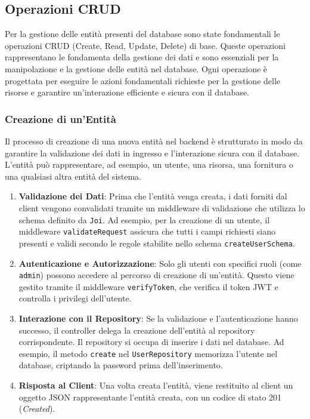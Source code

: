 \documentclass[twoside]{supsistudent}
\begin{document}
\subsection{Operazioni CRUD}

Per la gestione delle entità presenti del database sono state fondamentali le operazioni CRUD (Create, Read, Update, Delete) di base. Queste operazioni rappresentano le fondamenta della gestione dei dati e sono essenziali per la manipolazione e la gestione delle entità nel database. Ogni operazione è progettata per eseguire le azioni fondamentali richieste per la gestione delle risorse e garantire un'interazione efficiente e sicura con il database.

\subsubsection{Creazione di un'Entità}

Il processo di creazione di una nuova entità nel backend è strutturato in modo da garantire la validazione dei dati in ingresso e l'interazione sicura con il database. L'entità può rappresentare, ad esempio, un utente, una risorsa, una fornitura o una qualsiasi altra entità del sistema.

\begin{enumerate}
  \item \textbf{Validazione dei Dati}: Prima che l'entità venga creata, i dati forniti dal client vengono convalidati tramite un middleware di validazione che utilizza lo schema definito da \texttt{Joi}. Ad esempio, per la creazione di un utente, il middleware \texttt{validateRequest} assicura che tutti i campi richiesti siano presenti e validi secondo le regole stabilite nello schema \texttt{createUserSchema}.
  \item \textbf{Autenticazione e Autorizzazione}: Solo gli utenti con specifici ruoli (come \texttt{admin}) possono accedere al percorso di creazione di un'entità. Questo viene gestito tramite il middleware \texttt{verifyToken}, che verifica il token JWT e controlla i privilegi dell'utente.
  \item \textbf{Interazione con il Repository}: Se la validazione e l'autenticazione hanno successo, il controller delega la creazione dell'entità al repository corrispondente. Il repository si occupa di inserire i dati nel database. Ad esempio, il metodo \texttt{create} nel \texttt{UserRepository} memorizza l'utente nel database, criptando la password prima dell'inserimento.
  \item \textbf{Risposta al Client}: Una volta creata l'entità, viene restituito al client un oggetto JSON rappresentante l'entità creata, con un codice di stato 201 (\textit{Created}).
\end{enumerate}
\end{document}
